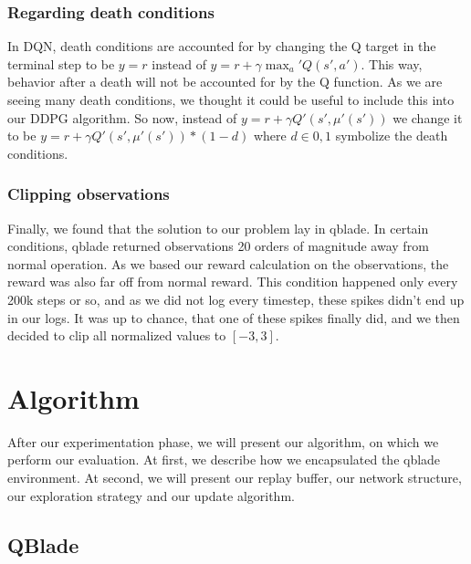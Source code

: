 \documentclass[hyperref,german,beleg]{cgvpub}
\begin{document}
\subsection{Regarding death conditions}

In \ac{DQN}, death conditions are accounted for by changing the Q target in the terminal step to be $y = r$ instead of $y = r + \gamma \max_a' Q(s', a')$. This way, behavior after a death will not be accounted for by the Q function. As we are seeing many death conditions, we thought it could be useful to include this into our DDPG algorithm. So now, instead of $y = r + \gamma Q'(s', \mu'(s'))$ we change it to be $y = r + \gamma Q'(s', \mu'(s')) * (1-d)$ where $d \in {0, 1}$ symbolize the death conditions.

\subsection{Clipping observations}

Finally, we found that the solution to our problem lay in qblade. In certain conditions, qblade returned observations 20 orders of magnitude away from normal operation. As we based our reward calculation on the observations, the reward was also far off from normal reward. This condition happened only every 200k steps or so, and as we did not log every timestep, these spikes didn't end up in our logs. It was up to chance, that one of these spikes finally did, and we then decided to clip all normalized values to $[-3, 3]$.

\chapter{Algorithm}

After our experimentation phase, we will present our algorithm, on which we perform our evaluation. At first, we describe how we encapsulated the qblade environment. At second, we will present our replay buffer, our network structure, our exploration strategy and our update algorithm.

\section{QBlade}

\label{sec:alg_qblade}
\end{document}
